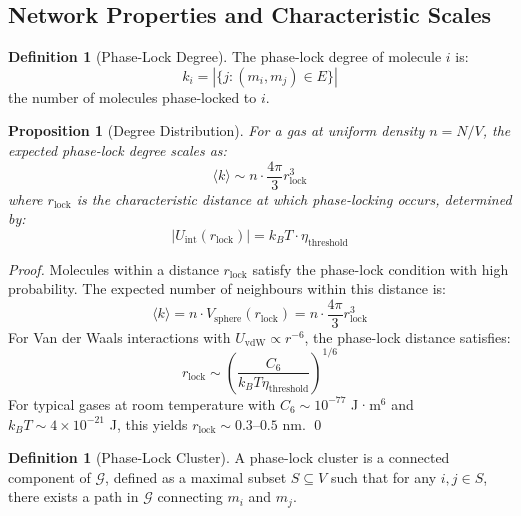 \documentclass[12pt,a4paper]{article}
\newtheorem{proposition}[theorem]{Proposition}
\theoremstyle{definition}
\newtheorem{definition}[theorem]{Definition}
\theoremstyle{remark}
\newcommand{\phaselockgraph}{\mathcal{G}}
\begin{document}
\subsection{Network Properties and Characteristic Scales}

\begin{definition}[Phase-Lock Degree]
\label{def:phase_lock_degree}
The phase-lock degree of molecule $i$ is:
\begin{equation}
k_i = |\{j : (m_i, m_j) \in E\}|
\end{equation}
the number of molecules phase-locked to $i$.
\end{definition}

\begin{proposition}[Degree Distribution]
\label{prop:degree_distribution}
For a gas at uniform density $n = N/V$, the expected phase-lock degree scales as:
\begin{equation}
\langle k \rangle \sim n \cdot \frac{4\pi}{3} r_{\text{lock}}^3
\label{eq:expected_degree}
\end{equation}
where $r_{\text{lock}}$ is the characteristic distance at which phase-locking occurs, determined by:
\begin{equation}
|U_{\text{int}}(r_{\text{lock}})| = k_B T \cdot \eta_{\text{threshold}}
\end{equation}
\end{proposition}

\begin{proof}
Molecules within a distance $r_{\text{lock}}$ satisfy the phase-lock condition with high probability. The expected number of neighbours within this distance is:
\begin{equation}
\langle k \rangle = n \cdot V_{\text{sphere}}(r_{\text{lock}}) = n \cdot \frac{4\pi}{3} r_{\text{lock}}^3
\end{equation}
For Van der Waals interactions with $U_{\text{vdW}} \propto r^{-6}$, the phase-lock distance satisfies:
\begin{equation}
r_{\text{lock}} \sim \left(\frac{C_6}{k_B T \eta_{\text{threshold}}}\right)^{1/6}
\end{equation}
For typical gases at room temperature with $C_6 \sim 10^{-77}$ J·m$^6$ and $k_B T \sim 4 \times 10^{-21}$ J, this yields $r_{\text{lock}} \sim 0.3$--$0.5$ nm. \qed
\end{proof}

\begin{definition}[Phase-Lock Cluster]
\label{def:phase_lock_cluster}
A phase-lock cluster is a connected component of $\phaselockgraph$, defined as a maximal subset $S \subseteq V$ such that for any $i, j \in S$, there exists a path in $\phaselockgraph$ connecting $m_i$ and $m_j$.
\end{definition}
\end{document}
